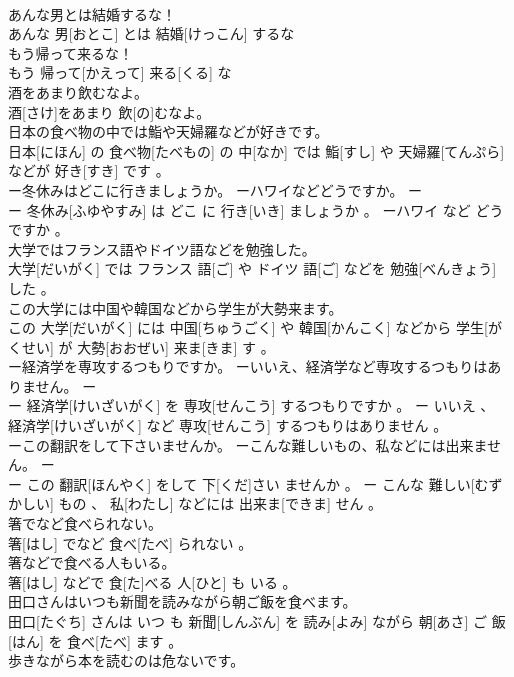 \documentclass[8pt]{extreport}
\begin{document}
\begin{CJK}{UTF8}{min}
\\	あんな男とは結婚するな！	
\\	あんな 男[おとこ] とは 結婚[けっこん] するな 
\\	もう帰って来るな！	
\\	もう 帰って[かえって] 来る[くる] な 
\\	酒をあまり飲むなよ。	
\\	酒[さけ]をあまり 飲[の]むなよ。
\\	日本の食べ物の中では鮨や天婦羅などが好きです。	
\\	日本[にほん] の 食べ物[たべもの] の 中[なか] では 鮨[すし] や 天婦羅[てんぷら] などが 好き[すき] です 。
\\	ー冬休みはどこに行きましょうか。 ーハワイなどどうですか。	ー
\\	ー 冬休み[ふゆやすみ] は どこ に 行き[いき] ましょうか 。 ーハワイ など どう ですか 。
\\	大学ではフランス語やドイツ語などを勉強した。	
\\	大学[だいがく] では フランス 語[ご] や ドイツ 語[ご] などを 勉強[べんきょう] した 。
\\	この大学には中国や韓国などから学生が大勢来ます。	
\\	この 大学[だいがく] には 中国[ちゅうごく] や 韓国[かんこく] などから 学生[がくせい] が 大勢[おおぜい] 来ま[きま] す 。
\\	ー経済学を専攻するつもりですか。 ーいいえ、経済学など専攻するつもりはありません。	ー
\\	ー 経済学[けいざいがく] を 専攻[せんこう] するつもりですか 。 ー いいえ 、 経済学[けいざいがく] など 専攻[せんこう] するつもりはありません 。
\\	ーこの翻訳をして下さいませんか。 ーこんな難しいもの、私などには出来ません。	ー
\\	ー この 翻訳[ほんやく] をして 下[くだ]さい ませんか 。 ー こんな 難しい[むずかしい] もの 、 私[わたし] などには 出来ま[できま] せん 。
\\	箸でなど食べられない。	
\\	箸[はし] でなど 食べ[たべ] られない 。
\\	箸などで食べる人もいる。	
\\	箸[はし] などで 食[た]べる 人[ひと] も いる 。
\\	田口さんはいつも新聞を読みながら朝ご飯を食べます。	
\\	田口[たぐち] さんは いつ も 新聞[しんぶん] を 読み[よみ] ながら 朝[あさ] ご 飯[はん] を 食べ[たべ] ます 。
\\	歩きながら本を読むのは危ないです。	

\end{CJK}
\end{document}
